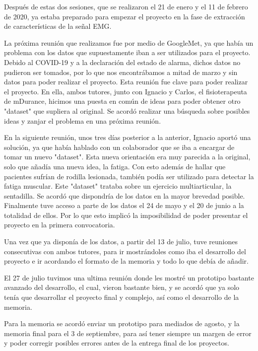 Después de estas dos sesiones, que se realizaron el 21 de enero y el 11 de febrero de 2020, ya estaba preparado para empezar el proyecto en la fase de extracción de características de la señal EMG.

La próxima reunión que realizamos fue por medio de GoogleMet, ya que había un problema con los datos que supuestamente iban a ser utilizados para el proyecto. Debido al COVID-19 y a la declaración del estado de alarma, dichos datos no pudieron ser tomados, por lo que nos encontrábamos a mitad de marzo y sin datos para poder realizar el proyecto. Esta reunión fue clave para poder realizar el proyecto. En ella, ambos tutores, junto con Ignacio y Carlos, el fisioterapeuta de mDurance, hicimos una puesta en común de ideas para poder obtener otro "dataset" que supliera al original. Se acordó realizar una búsqueda sobre posibles ideas y zanjar el problema en una próxima reunión.

En la siguiente reunión, unos tres días posterior a la anterior, Ignacio aportó una solución, ya que había hablado con un colaborador que se iba a encargar de tomar un nuevo "dataset". Esta nueva orientación era muy parecida a la original, solo que añadía una nueva idea, la fatiga. Con esto además de hallar que pacientes sufrían de rodilla lesionada, también podía ser utilizado para detectar la fatiga muscular. Este "dataset" trataba sobre un ejercicio multiarticular, la sentadilla. Se acordó que dispondría de los datos en la mayor brevedad posible. Finalmente tuve acceso a parte de los datos el 24 de mayo y el 20 de junio a la totalidad de ellos. Por lo que esto implicó la imposibilidad de poder presentar el proyecto en la primera convocatoria.

Una vez que ya disponía de los datos, a partir del 13 de julio, tuve reuniones consecutivas con ambos tutores, para ir mostrándoles como iba el desarrollo del proyecto e ir acordando el formato de la memoria y todo lo que debía de añadir.

El 27 de julio tuvimos una ultima reunión donde les mostré un prototipo bastante avanzado del desarrollo, el cual, vieron bastante bien, y se acordó que ya solo tenía que desarrollar el proyecto final y complejo, así como el desarrollo de la memoria. 

Para la memoria se acordó enviar un prototipo para mediados de agosto, y la memoria final para el 3 de septiembre, para así tener siempre un margen de error y poder corregir posibles errores antes de la entrega final de los proyectos.

